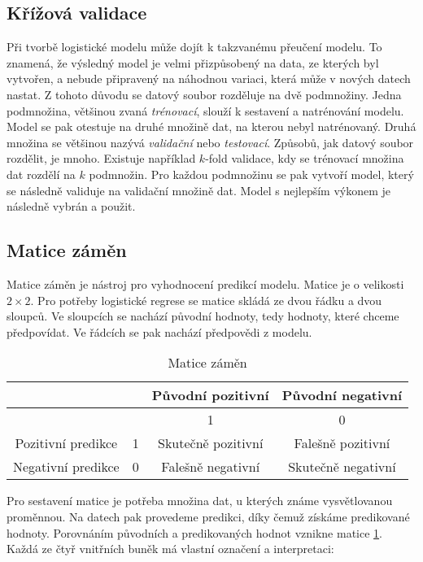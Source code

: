 \subsection{Křížová validace}
Při
{\color{red}
tvorbě
}
logistické modelu může dojít k takzvanému přeučení modelu. To znamená, že výsledný model je velmi přizpůsobený na data, ze kterých byl vytvořen, a nebude
připravený na náhodnou variaci, která může v nových datech nastat. Z tohoto důvodu se datový soubor rozděluje na dvě podmnožiny. Jedna podmnožina, většinou zvaná
\textit{trénovací},
slouží k sestavení a natrénování modelu. 
{\color{red}
Model se pak otestuje 
}
na druhé množině dat, na kterou nebyl natrénovaný. Druhá množina se většinou nazývá \textit{validační} nebo \textit{testovací}. 
{\color{red}
Způsobů, jak datový soubor
}
rozdělit, je mnoho. Existuje například $k$-fold validace, kdy se trénovací množina dat rozdělí na $k$ podmnožin. Pro každou podmnožinu se pak vytvoří
model, který se následně validuje na validační množině dat. Model s nejlepším výkonem je následně vybrán a použit.


\subsection{Matice záměn}
Matice záměn je nástroj pro vyhodnocení predikcí modelu. Matice je o velikosti $2 \times 2$. Pro potřeby logistické regrese se matice skládá ze dvou řádku a dvou sloupců.
{\color{red}
Ve sloupcích se nachází původní hodnoty, tedy hodnoty, které chceme předpovídat. Ve řádcích se pak nachází předpovědi z modelu.  
}

\begin{table}[H]
    \centering
    \begin{tabular}{|c|c|c|c|}
        \hline
                           &   & Původní pozitivní   & Původní negativní    \\ \hline
                           &   & 1                  & 0                  \\ \hline
        Pozitivní predikce & 1 & Skutečně pozitivní & Falešně pozitivní  \\ \hline
        Negativní predikce & 0 & Falešně negativní  & Skutečně negativní \\ \hline
    \end{tabular}
    \caption{\label{tab:matice_zamen}Matice záměn}
\end{table}

Pro sestavení matice je potřeba množina dat, u kterých známe vysvětlovanou proměnnou. Na datech pak provedeme predikci, díky čemuž získáme predikované hodnoty. Porovnáním
původních a predikovaných hodnot vznikne matice \ref{tab:matice_zamen}. Každá ze čtyř vnitřních buněk má vlastní označení a interpretaci:

